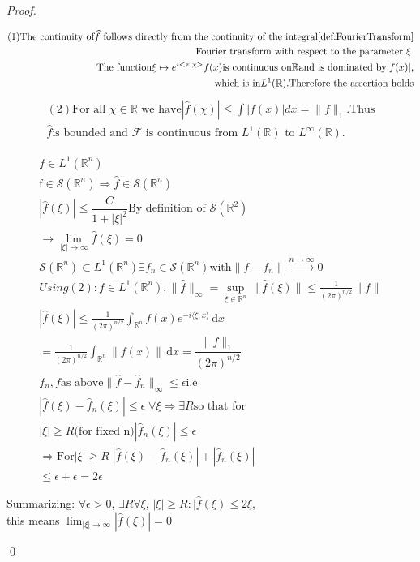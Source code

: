 \documentclass[12pt, oneside, a4paper]{article}
\theoremstyle{dfn}
\newcommand{\scalprod}[2]{\langle #1,#2 \rangle}
\def \S {\ensuremath{\mathcal{S}}}
\def \S {\ensuremath{\mathcal{S}}}
\def\Rbb{\ensuremath{\mathbb{R}}}
\def\dx{\,\mathrm dx}
\begin{document}
\begin{proof}
\begin{flushleft}
 \begin{align*}
(1) \text{The continuity of} \widehat{f}\text{ follows directly from the continuity of the integral}
 \ref{def:FourierTransform} \\
\text{Fourier transform with respect to the parameter $\xi$.}\\
 \text{The function} \xi \mapsto e^{i <x, \chi>}f(x) 
\text{is continuous on} \Rbb \text{and is dominated by} |f(x)|, 
\\ \text{which is in} L^1(\Rbb). \text{Therefore the assertion holds}
\end{align*}
\begin{align*}
(2)\text{For all $\chi \in \Rbb$ we have} |\widehat{f}(\chi)| \leq \int|f(x)|dx = \|f\|_{1}. \text{Thus} \\
\widehat{f} \text{is bounded and $\mathcal{F}$ is continuous from $L^{1}(\Rbb)$ to $L^{\infty}(\Rbb)$.} 
\end{align*} 
\end{flushleft} 

\begin{eqnarray*}
 f \in L^1(\Rbb^{n}) \\
\text{f} \in \mathcal{S}(\Rbb^n) \Rightarrow \widehat{f} \in \mathcal{S}(\Rbb^n) \\
|\widehat{f}(\xi)| \leq \dfrac{C}{1 + |\xi|^{2}} \text{By definition of $\mathcal{S}(\Rbb^{2})$}\\
\rightarrow \lim_{|\xi| \rightarrow \infty} \widehat{f} (\xi) = 0 \\
\S(\Rbb^n) \subset L^1(\Rbb^{n}) \exists f_n \in \S(\Rbb^{n}) \text{with} \| f - f_{n}\| \stackrel{n \rightarrow 
\infty}{\rightarrow} 0 \\
Using (2) : f \in L^1(\Rbb^n), \|\widehat{f}\|_{\infty} = \sup_{\xi \in \Rbb^{n}}\|\widehat{f}(\xi)\| \leq \frac{1}{(2\pi)^{n/2}}\|
f\| \\
|\widehat{f}(\xi)| \leq \frac{1}{(2\pi)^{n/2}} \int_{\Rbb^n} f(x) e^{-i \scalprod{\xi}{x}} \dx \\
= \frac{1}{(2\pi)^{n/2}} \int_{\Rbb^n}\| f(x) \|\dx  = \dfrac{\|f\|_{1}}{(2\pi)^{n/2}}
\\
f_n, f \text{as above} \| \widehat{f} - \widehat{f}_{n}\|_{\infty} \leq \epsilon \text{i.e} \\
 | \widehat{f}(\xi) - \widehat{f}_{n}(\xi)| \leq \epsilon \; \forall \xi  \Rightarrow \exists R \text{so that for} \\
|\xi| \geq R \text{(for fixed n)} |\widehat{f}_{n}(\xi)| \leq \epsilon \\
\Rightarrow \text{For} |\xi| \geq R \;   |\widehat{f}(\xi) - \widehat{f}_{n}(\xi)| + |\widehat{f}_{n}(\xi)| \\
                                      \leq \epsilon + \epsilon = 2 \epsilon
\end{eqnarray*}
\begin{flushleft}
Summarizing: $\forall \epsilon > 0$, $\exists R \forall \xi$, $|\xi| \geq R \colon |\widehat{f}(\xi) \leq 2 \xi$,\\
this means $\lim_{|\xi| \rightarrow \infty}|\widehat{f}(\xi)| = 0$
\end{flushleft} \qed
\end{proof}
\end{document}
